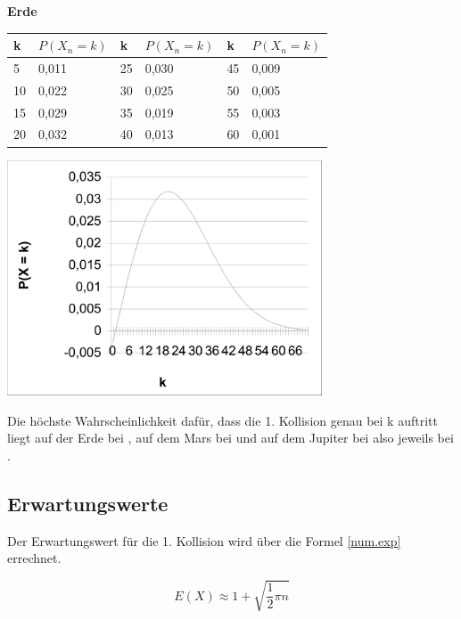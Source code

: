 \documentclass[../main.tex]{subfiles}
\begin{document}
\textbf{Erde}

\begin{table}[h]
\centering
\begin{tabular}{l|l|l|l|l|l}
k  & $P(X_{n} = k)$ & k  & $P(X_{n} = k)$ & k  & $P(X_{n} = k)$ \\ \hline
5  & 0,011            & 25 & 0,030            & 45 & 0,009            \\
10 & 0,022            & 30 & 0,025            & 50 & 0,005            \\
15 & 0,029            & 35 & 0,019            & 55 & 0,003            \\
20 & 0,032            & 40 & 0,013            & 60 & 0,001
\end{tabular}
\end{table}

\begin{center}
 \includegraphics[width=0.7\textwidth]{../graphics/peq.png}
\end{center}

Die höchste Wahrscheinlichkeit dafür, dass die 1. Kollision genau bei k auftritt liegt auf der Erde bei , auf dem Mars bei  und auf dem Jupiter bei  also jeweils bei .

\subsection{Erwartungswerte}

Der Erwartungswert für die 1. Kollision wird über die Formel \ref{num.exp} errechnet.

\begin{equation}
 E(X) \approx 1 + \sqrt{\frac{1}{2} \pi n}
 \label{num.exp}
\end{equation}
\end{document}
